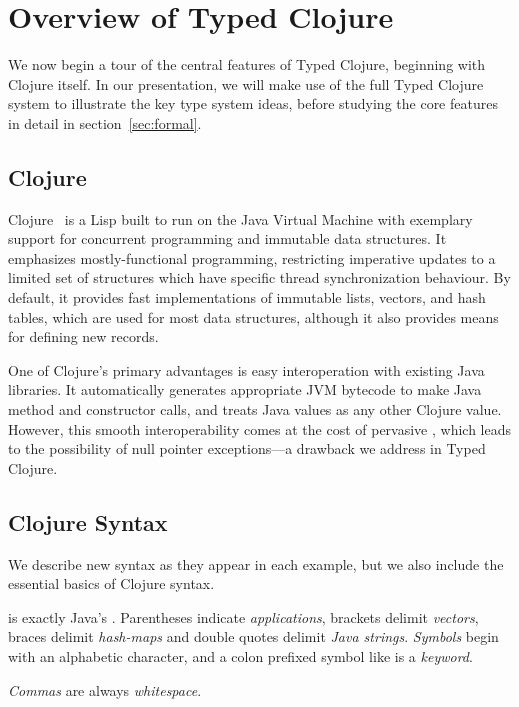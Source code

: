 \section{Overview of Typed Clojure}

\label{sec:overview}

We now begin a tour of the central features of Typed Clojure,
beginning with Clojure itself. In our presentation, we will make 
use of the full Typed Clojure system to illustrate the key type system
ideas, before studying the core features in detail in
section~\ref{sec:formal}. 

\subsection{Clojure}

Clojure~\cite{Hic08} is a Lisp built to run on the
Java Virtual Machine with exemplary support for concurrent programming
and immutable data structures. It emphasizes mostly-functional
programming, restricting imperative updates to a limited set of
structures which have specific thread synchronization behaviour. By
default, it provides fast implementations of immutable lists, vectors,
and hash tables, which are used for most data structures, although it
also provides means for defining new records.

One of Clojure's primary advantages is easy interoperation with
existing Java libraries. It automatically generates appropriate JVM
bytecode to make Java method and constructor calls, and treats Java
values as any other Clojure value. However, this smooth
interoperability comes at the cost of pervasive , which
leads to the possibility of null pointer exceptions---a drawback we
address in Typed Clojure.

\subsection{Clojure Syntax}

We describe new syntax as they appear in each example, but
we also include the essential basics of Clojure syntax.

 is exactly Java's .
Parentheses indicate \emph{applications}, brackets
delimit
\emph{vectors}, braces
delimit
\emph{hash-maps}
and double quotes delimit \emph{Java strings}.
\emph{Symbols} begin with an alphabetic character,
and a colon prefixed symbol like  is a \emph{keyword}.

\emph{Commas} are always \emph{whitespace}.

